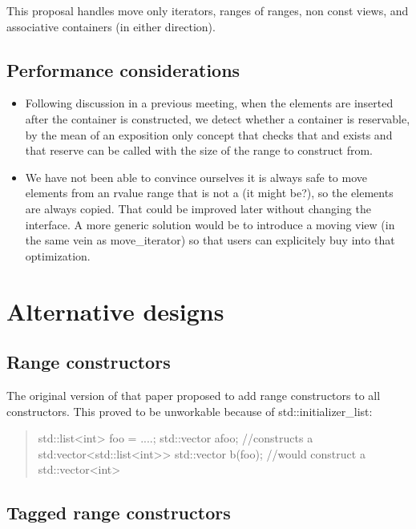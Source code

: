 \documentclass{wg21}
\begin{document}
This proposal handles move only iterators, ranges of ranges, non const views, and associative containers (in either direction).


\subsection{Performance considerations}
\begin{itemize}
\item Following discussion in a previous meeting, when the elements are inserted
after the container is constructed, we detect whether a container is reservable,
by the mean of an exposition only concept that checks that  and  exists and that reserve can be called with the size of the range to construct from.

\item We have not been able to convince ourselves it is always safe to move elements from an rvalue range that is not a  (it might be?), so the elements are always copied.
That could be improved later without changing the interface.
A more generic solution would be to introduce a moving view (in the same vein as move_iterator) so that users can explicitely 
buy into that optimization.

\end{itemize}


\section{Alternative designs}

\subsection{Range constructors}

The original version of that paper proposed to add range constructors to all constructors. This proved to be unworkable because of std::initializer_list:

\begin{quote}
\begin{colorblock}
std::list<int> foo = ....;
std::vector a{foo}; //constructs a std:vector<std::list<int>>
std::vector b(foo); //would construct a std::vector<int>
\end{colorblock}
\end{quote}

\subsection{Tagged range constructors}
\end{document}
